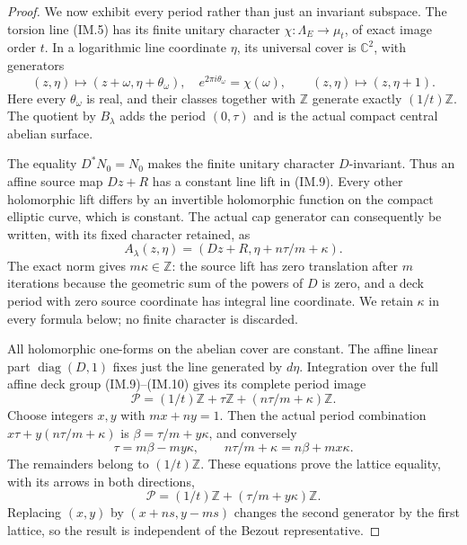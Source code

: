 \begin{proof}
We now exhibit every period rather than just an invariant subspace.
The torsion line (IM.5) has its finite unitary character
\(\chi:\Lambda_E\to\mu_t\), of exact image order \(t\).
In a logarithmic line coordinate \(\eta\), its universal cover is
\(\mathbb C^2\), with generators
\[
 (z,\eta)\longmapsto(z+\omega,\eta+\theta_\omega),
 \quad e^{2\pi i\theta_\omega}=\chi(\omega),
 \qquad (z,\eta)\longmapsto(z,\eta+1).
                                                               \tag{IM.9}
\]
Here every \(\theta_\omega\) is real, and their classes together
with \(\mathbb Z\) generate exactly \((1/t)\mathbb Z\).
The quotient by \(B_\lambda\) adds the period \((0,\tau)\)
and is the actual compact central abelian surface.

The equality \(D^*N_0=N_0\) makes the finite unitary character
\(D\)-invariant. Thus an affine source map \(Dz+R\) has a
constant line lift in (IM.9). Every other holomorphic lift differs
by an invertible holomorphic function on the compact elliptic curve,
which is constant. The actual cap generator can consequently be
written, with its fixed character retained, as
\[
 A_\lambda(z,\eta)
       =(Dz+R,\eta+n\tau/m+\kappa).                  \tag{IM.10}
\]
The exact norm gives \(m\kappa\in\mathbb Z\): the source lift
has zero translation after \(m\) iterations because the geometric
sum of the powers of \(D\) is zero, and a deck period with zero
source coordinate has integral line coordinate. We retain \(\kappa\) in every
formula below; no finite character is discarded.

All holomorphic one-forms on the abelian cover are constant.
The affine linear part \(\operatorname{diag}(D,1)\) fixes just
the line generated by \(d\eta\). Integration over the full
affine deck group (IM.9)--(IM.10) gives its complete period image
\[
 \mathcal P=(1/t)\mathbb Z+\tau\mathbb Z
                         +(n\tau/m+\kappa)\mathbb Z. \tag{IM.11}
\]
Choose integers \(x,y\) with \(mx+ny=1\). Then the actual
period combination
\(x\tau+y(n\tau/m+\kappa)\) is
\(\beta=\tau/m+y\kappa\), and conversely
\[
  \tau=m\beta-my\kappa,\qquad
  n\tau/m+\kappa=n\beta+mx\kappa.
                                                               \tag{IM.12}
\]
The remainders belong to \((1/t)\mathbb Z\). These equations
prove the lattice equality, with its arrows in both directions,
\[
                 \mathcal P=(1/t)\mathbb Z
                             +(\tau/m+y\kappa)\mathbb Z.
                                                               \tag{IM.13}
\]
Replacing \((x,y)\) by \((x+ns,y-ms)\) changes the second
generator by the first lattice, so the result is independent of
the Bezout representative.


\end{proof}
